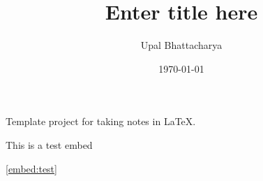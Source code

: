 \documentclass[a4paper,colorinlistoftodos]{article}
\author{Upal Bhattacharya}
\date{\today}
\title{Enter title here}
\begin{document}
\maketitle

\begingroup
    \hypersetup{linkcolor=black}
    \tableofcontents
    \pagebreak
\endgroup

\linenumbers

Template project for taking notes in \LaTeX.

\begin{scontents}[store-env=embed:test,print-env=true]
  \label{embed:test}
  This is a test embed
\end{scontents}

\newpage


\ref{embed:test}




\pagebreak
\nolinenumbers
\appendix

\begingroup
    \hypersetup{linkcolor=black}
    \listoftodos
    \listofchanges
    \pagebreak
\endgroup
\end{document}
